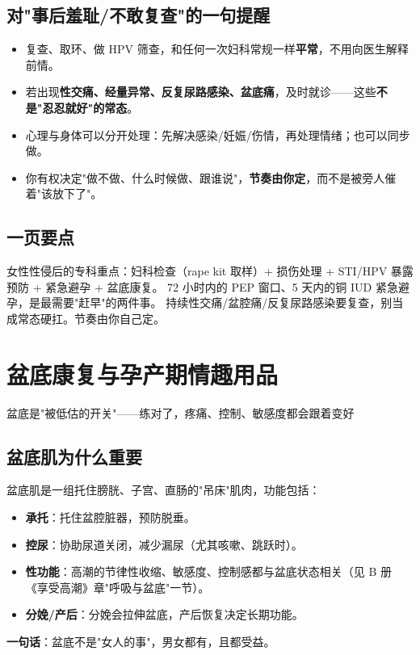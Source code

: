 \section{对"事后羞耻/不敢复查"的一句提醒}
\begin{itemize}
  \item 复查、取环、做 HPV 筛查，和任何一次妇科常规一样\textbf{平常}，不用向医生解释前情。
  \item 若出现\textbf{性交痛、经量异常、反复尿路感染、盆底痛}，及时就诊——这些\textbf{不是"忍忍就好"的常态}。
  \item 心理与身体可以分开处理：先解决感染/妊娠/伤情，再处理情绪；也可以同步做。
  \item 你有权决定"做不做、什么时候做、跟谁说"，\textbf{节奏由你定}，而不是被旁人催着"该放下了"。
\end{itemize}

\section{一页要点}
女性性侵后的专科重点：妇科检查（rape kit 取样）+ 损伤处理 + STI/HPV 暴露预防 + 紧急避孕 + 盆底康复。
72 小时内的 PEP 窗口、5 天内的铜 IUD 紧急避孕，是最需要"赶早"的两件事。
持续性交痛/盆腔痛/反复尿路感染要复查，别当成常态硬扛。节奏由你自己定。


\chapter{盆底康复与孕产期情趣用品}

\begin{center}
\myhei\large 盆底是"被低估的开关"——练对了，疼痛、控制、敏感度都会跟着变好
\end{center}

\section{盆底肌为什么重要}
盆底肌是一组托住膀胱、子宫、直肠的"吊床"肌肉，功能包括：
\begin{itemize}[leftmargin=2em,itemsep=0.3em]
  \item \textbf{承托}：托住盆腔脏器，预防脱垂。
  \item \textbf{控尿}：协助尿道关闭，减少漏尿（尤其咳嗽、跳跃时）。
  \item \textbf{性功能}：高潮的节律性收缩、敏感度、控制感都与盆底状态相关（见 B 册《享受高潮》章"呼吸与盆底"一节）。
  \item \textbf{分娩/产后}：分娩会拉伸盆底，产后恢复决定长期功能。
\end{itemize}
\textbf{一句话}：盆底不是"女人的事"，男女都有，且都受益。

